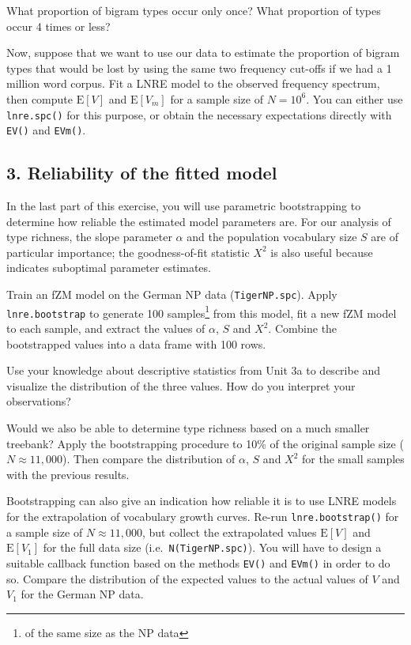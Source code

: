 \documentclass[a4paper,12pt]{article}
\begin{document}
What proportion of bigram types occur only once? What proportion of types
occur 4 times or less?

Now, suppose that we want to use our data to estimate the proportion
of bigram types that would be lost by using the same two frequency
cut-offs if we had a 1 million word corpus.  
Fit a LNRE model to the observed frequency spectrum, then compute $\mathrm{E}[V]$ and $\mathrm{E}[V_m]$
for a sample size of $N = 10^6$.  You can either use \texttt{lnre.spc()} for this purpose, or obtain the
necessary expectations directly with \texttt{EV()} and \texttt{EVm()}.


\subsection*{3. Reliability of the fitted model}

In the last part of this exercise, you will use parametric bootstrapping to determine how reliable the estimated model parameters are. For our analysis of type richness, the slope parameter $\alpha$ and the population vocabulary size $S$ are of particular importance; the goodness-of-fit statistic $X^2$ is also useful because indicates suboptimal parameter estimates.

Train an fZM model on the German NP data (\texttt{TigerNP.spc}).  Apply \texttt{lnre.bootstrap} to generate 100 samples\footnote{of the same size as the NP data} from this model, fit a new fZM model to each sample, and extract the values of $\alpha$, $S$ and $X^2$.  Combine the bootstrapped values into a data frame with 100 rows.

Use your knowledge about descriptive statistics from Unit 3a to describe and visualize the distribution of the three values.  How do you interpret your observations?

Would we also be able to determine type richness based on a much smaller treebank?   Apply the bootstrapping procedure to 10\% of the original sample size ($N \approx 11{,}000$).  Then compare the distribution of $\alpha$, $S$ and $X^2$ for the small samples with the previous results.

Bootstrapping can also give an indication how reliable it is to use LNRE models for the extrapolation of vocabulary growth curves.  Re-run \texttt{lnre.bootstrap()} for a sample size of $N \approx 11{,}000$, but collect the extrapolated values $\mathrm{E}[V]$ and $\mathrm{E}[V_1]$ for the full data size (i.e.\ \texttt{N(TigerNP.spc)}).  You will have to design a suitable callback function based on the methods \texttt{EV()} and \texttt{EVm()} in order to do so.  Compare the distribution of the expected values to the actual values of $V$ and $V_1$ for the German NP data.
\end{document}
